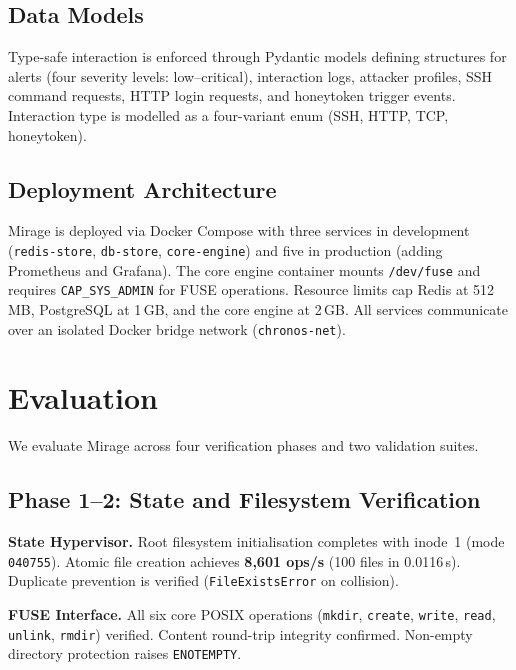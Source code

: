 \documentclass[conference]{IEEEtran}
\begin{document}
\subsection{Data Models}

Type-safe interaction is enforced through Pydantic models defining structures for alerts (four severity levels: low--critical), interaction logs, attacker profiles, SSH command requests, HTTP login requests, and honeytoken trigger events.
Interaction type is modelled as a four-variant enum (SSH, HTTP, TCP, honeytoken).

\subsection{Deployment Architecture}

Mirage is deployed via Docker Compose with three services in development (\texttt{redis-store}, \texttt{db-store}, \texttt{core-engine}) and five in production (adding Prometheus and Grafana).
The core engine container mounts \texttt{/dev/fuse} and requires \texttt{CAP\_SYS\_ADMIN} for FUSE operations.
Resource limits cap Redis at 512\,MB, PostgreSQL at 1\,GB, and the core engine at 2\,GB.
All services communicate over an isolated Docker bridge network (\texttt{chronos-net}).

\section{Evaluation}
\label{sec:evaluation}

We evaluate Mirage across four verification phases and two validation suites.

\subsection{Phase 1--2: State and Filesystem Verification}

\textbf{State Hypervisor.}
Root filesystem initialisation completes with inode~1 (mode \texttt{040755}).
Atomic file creation achieves \textbf{8{,}601 ops/s} (100 files in 0.0116\,s).
Duplicate prevention is verified (\texttt{FileExistsError} on collision).

\textbf{FUSE Interface.}
All six core POSIX operations (\texttt{mkdir}, \texttt{create}, \texttt{write}, \texttt{read}, \texttt{unlink}, \texttt{rmdir}) verified.
Content round-trip integrity confirmed.
Non-empty directory protection raises \texttt{ENOTEMPTY}.
\end{document}
